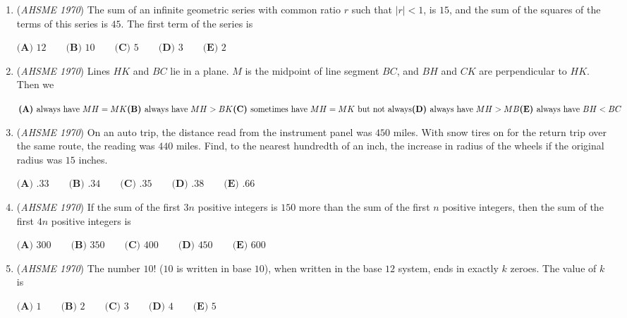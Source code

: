 \begin{enumerate}
 $\textbf{(A) }2\qquad \textbf{(B) }2\sqrt{3}\qquad \textbf{(C) }4\sqrt{2}\qquad \textbf{(D) }\sqrt{6}\qquad  \textbf{(E) }2\sqrt{2}$


	\item (\textit{AHSME 1970}) The sum of an infinite geometric series with common ratio $r$ such that $|r|<1$, is $15$,
and the sum of the squares of the terms of this series is $45$. The first term of the series is


 $\textbf{(A) }12\qquad \textbf{(B) }10\qquad \textbf{(C) }5\qquad \textbf{(D) }3\qquad  \textbf{(E) }2$


	\item (\textit{AHSME 1970}) Lines $HK$ and $BC$ lie in a plane. $M$ is the midpoint of line segment $BC$, and $BH$ and $CK$ are perpendicular to $HK$. Then we 


 $\textbf{(A) }\text{always have }MH=MK\qquad\\ \textbf{(B) }\text{always have }MH>BK\qquad\\ \textbf{(C) }\text{sometimes have }MH=MK\text{ but not always}\qquad\\ \textbf{(D) }\text{always have }MH>MB\qquad \\ \textbf{(E) }\text{always have }BH<BC$


	\item (\textit{AHSME 1970}) On an auto trip, the distance read from the instrument panel was $450$ miles. 
With snow tires on for the return trip over the same route, the reading was $440$ miles. 
Find, to the nearest hundredth of an inch, the increase in radius of the wheels if the original radius was $15$ inches.


 $\textbf{(A) }.33\qquad \textbf{(B) }.34\qquad \textbf{(C) }.35\qquad \textbf{(D) }.38\qquad  \textbf{(E) }.66$


	\item (\textit{AHSME 1970}) If the sum of the first $3n$ positive integers is $150$ more than the sum of the first $n$ positive integers,
then the sum of the first $4n$ positive integers is


 $\textbf{(A) }300\qquad \textbf{(B) }350\qquad \textbf{(C) }400\qquad \textbf{(D) }450\qquad  \textbf{(E) }600$


	\item (\textit{AHSME 1970}) The number $10!$ ($10$ is written in base $10$), when written in the base $12$ system, ends in exactly $k$ zeroes. The value of $k$ is


 $\textbf{(A) }1\qquad \textbf{(B) }2\qquad \textbf{(C) }3\qquad \textbf{(D) }4\qquad  \textbf{(E) } 5$



\end{enumerate}
